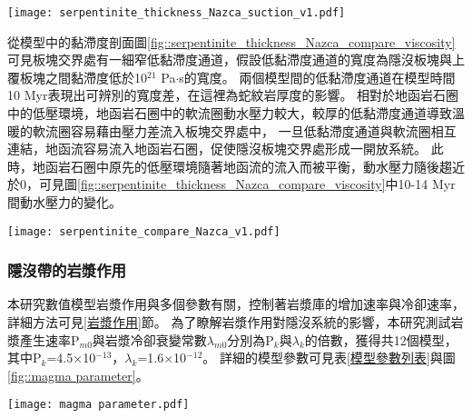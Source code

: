 \begin{figure*}[ht!]
    \centering
    \texttt{[image: serpentinite\_thickness\_Nazca\_suction\_v1.pdf]}
    \caption[測試蛇紋岩厚度模型之動水壓力力矩]{測試蛇紋岩厚度模型之動水壓力力矩，模型與圖\ref{fig::slab_geometry_serpentinite_thickness_Nazca_top}所使用的圖例相同。}
    \label{fig::serpentinite_thickness_Nazca_suction}
\end{figure*}

從模型中的黏滯度剖面圖\ref{fig::serpentinite_thickness_Nazca_compare_viscosity}可見板塊交界處有一細窄低黏滯度通道，假設低黏滯度通道的寬度為隱沒板塊與上覆板塊之間黏滯度低於10$^{21}$ Pa$\cdot$s的寬度。
兩個模型間的低黏滯度通道在模型時間10 Myr表現出可辨別的寬度差，在這裡為蛇紋岩厚度的影響。
相對於地函岩石圈中的低壓環境，地函岩石圈中的軟流圈動水壓力較大，較厚的低黏滯度通道導致溫暖的軟流圈容易藉由壓力差流入板塊交界處中，
一旦低黏滯度通道與軟流圈相互連結，地函流容易流入地函岩石圈，促使隱沒板塊交界處形成一開放系統。
此時，地函岩石圈中原先的低壓環境隨著地函流的流入而被平衡，動水壓力隨後趨近於0，可見圖\ref{fig::serpentinite_thickness_Nazca_compare_viscosity}中10-14 Myr間動水壓力的變化。

\begin{figure*}[htp!]
    \centering
    \texttt{[image: serpentinite\_compare\_Nazca\_v1.pdf]}
    \caption[測試蛇紋岩厚度模型於5 Myr、10 Myr、12 Myr與14 Myr之黏滯度與動水壓力剖面]{測試蛇紋岩厚度模型於5 Myr、10 Myr、12 Myr與14 Myr之黏滯度與動水壓力剖面。(a)蛇紋岩厚度為5公里的模型黏滯度剖面。(b)蛇紋岩厚度為7.5公里的模型黏滯度剖面。(c)蛇紋岩厚度為5公里的模型動水壓力剖面。(d)蛇紋岩厚度為7.5公里的模型動水壓力剖面。}
    \label{fig::serpentinite_thickness_Nazca_compare_viscosity}
\end{figure*}

\newpage
\subsubsection{隱沒帶的岩漿作用}
本研究數值模型岩漿作用與多個參數有關，控制著岩漿庫的增加速率與冷卻速率，詳細方法可見\ref{岩漿作用}節。
為了瞭解岩漿作用對隱沒系統的影響，本研究測試岩漿產生速率P$_{m0}$與岩漿冷卻衰變常數$\lambda_{m0}$分別為P$_k$與$\lambda_k$的倍數，獲得共12個模型，其中P$_k$=4.5$\times$10$^{-13}$，$\lambda_k$=1.6$\times$10$^{-12}$。
詳細的模型參數可見表\ref{模型參數列表}與圖\ref{fig::magma parameter}。

\begin{figure*}[ht]
    \centering
    \texttt{[image: magma parameter.pdf]}
    \caption[智利模型岩漿參數測試示意圖，詳細岩漿參數見表\ref{模型參數列表}]{智利模型岩漿參數測試示意圖，詳細岩漿參數見表\ref{模型參數列表}。底部顏色為圖\ref{fig::magma_area_compare_Nazca}中的說明顏色。}
    \label{fig::magma parameter}
\end{figure*}

